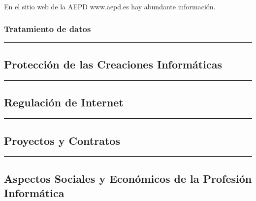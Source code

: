 \documentclass[spanish, 12pt, a4paper, twoside]{article}
\begin{document}
En el sitio web de la AEPD www.aepd.es hay abundante información.

\subsubsection*{Tratamiento de datos}

\hfill \break
\newpage
\hrule
\subsection{Protección de las Creaciones Informáticas}

\newpage
\hrule
\subsection{Regulación de Internet}

\newpage
\hrule
\subsection{Proyectos y Contratos}

\newpage
\hrule
\subsection{Aspectos Sociales y Económicos de la Profesión Informática}
\end{document}
